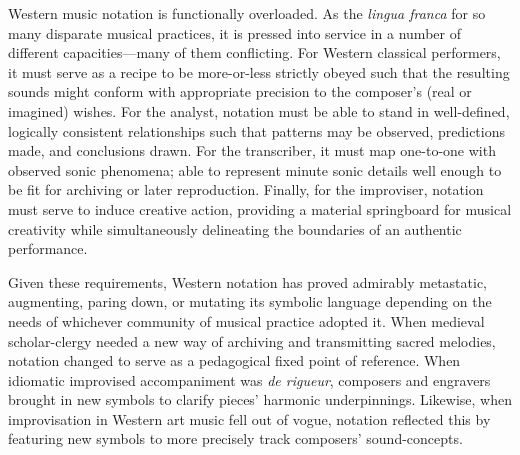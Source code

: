 

Western music notation is functionally overloaded.
As the \textit{lingua franca} for so many disparate musical practices, it is pressed into service in a number of different capacities---many of them conflicting.
For Western classical performers, it must serve as a recipe to be more-or-less strictly obeyed such that the resulting sounds might conform with appropriate precision to the composer's (real or imagined) wishes.
For the analyst, notation must be able to stand in well-defined, logically consistent relationships such that patterns may be observed, predictions made, and conclusions drawn.
For the transcriber, it must map one-to-one with observed sonic phenomena; able to represent minute sonic details well enough to be fit for archiving or later reproduction.
Finally, for the improviser, notation must serve to induce creative action, providing a material springboard for musical creativity while simultaneously delineating the boundaries of an authentic performance.

Given these requirements, Western notation has proved admirably metastatic, augmenting, paring down, or mutating its symbolic language depending on the needs of whichever community of musical practice adopted it.
When medieval scholar-clergy needed a new way of archiving and transmitting sacred melodies, notation changed to serve as a pedagogical fixed point of reference.
When idiomatic improvised accompaniment was \textit{de rigueur}, composers and engravers brought in new symbols to clarify pieces' harmonic underpinnings. 
Likewise, when improvisation in Western art music fell out of vogue, notation reflected this by featuring new symbols to more precisely track composers' sound-concepts.

